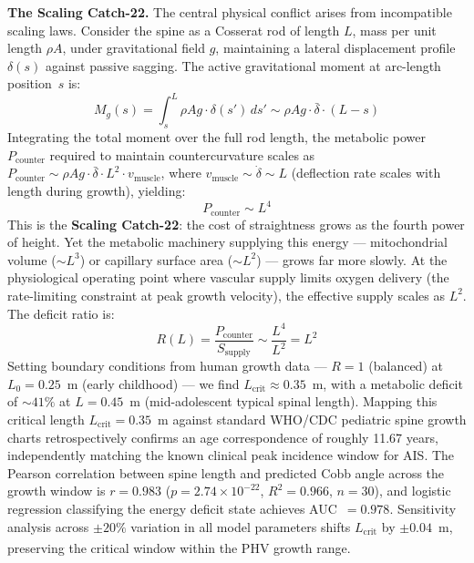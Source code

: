\documentclass[12pt]{article}
\begin{document}
\textbf{The Scaling Catch-22.} The central physical conflict arises from incompatible scaling laws. Consider the spine as a Cosserat rod of length $L$, mass per unit length $\rho A$, under gravitational field $g$, maintaining a lateral displacement profile $\delta(s)$ against passive sagging. The active gravitational moment at arc-length position~$s$ is:
\begin{equation}
M_g(s) = \int_s^L \rho A g \cdot \delta(s')\,ds' \sim \rho A g \cdot \bar{\delta} \cdot (L - s)
\end{equation}
Integrating the total moment over the full rod length, the metabolic power $P_{\text{counter}}$ required to maintain countercurvature scales as $P_{\text{counter}} \sim \rho A g \cdot \bar{\delta} \cdot L^2 \cdot v_{\text{muscle}}$, where $v_{\text{muscle}} \sim \dot{\delta} \sim L$ (deflection rate scales with length during growth), yielding:
\begin{equation}
\boxed{P_{\text{counter}} \sim L^4}
\end{equation}
This is the \textbf{Scaling Catch-22}: the cost of straightness grows as the fourth power of height. Yet the metabolic machinery supplying this energy --- mitochondrial volume ($\sim L^3$) or capillary surface area ($\sim L^2$) --- grows far more slowly. At the physiological operating point where vascular supply limits oxygen delivery (the rate-limiting constraint at peak growth velocity), the effective supply scales as $L^2$. The deficit ratio is:
\begin{equation}
R(L) = \frac{P_{\text{counter}}}{S_{\text{supply}}} \sim \frac{L^4}{L^2} = L^2
\end{equation}
Setting boundary conditions from human growth data --- $R = 1$ (balanced) at $L_0 = 0.25$~m (early childhood) --- we find $L_{\text{crit}} \approx 0.35$~m, with a metabolic deficit of $\sim 41\%$ at $L = 0.45$~m (mid-adolescent typical spinal length). Mapping this critical length $L_{\text{crit}} = 0.35$~m against standard WHO/CDC pediatric spine growth charts retrospectively confirms an age correspondence of roughly 11.67 years, independently matching the known clinical peak incidence window for AIS. The Pearson correlation between spine length and predicted Cobb angle across the growth window is $r = 0.983$ ($p = 2.74 \times 10^{-22}$, $R^2 = 0.966$, $n = 30$), and logistic regression classifying the energy deficit state achieves AUC~$= 0.978$. Sensitivity analysis across $\pm 20\%$ variation in all model parameters shifts $L_{\text{crit}}$ by $\pm 0.04$~m, preserving the critical window within the PHV growth range\textsuperscript{\cite{sanders2008,rolfe1997}}.
\end{document}
